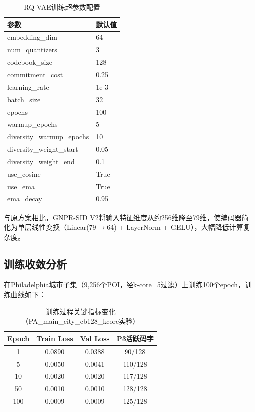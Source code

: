 \begin{table}[htbp]
\centering
\caption{RQ-VAE训练超参数配置}
\label{tab:rqvae_training_params}
\begin{tabular}{ll}
\toprule
参数 & 默认值 \\
\midrule
embedding\_dim & 64 \\
num\_quantizers & 3 \\
codebook\_size & 128 \\
commitment\_cost & 0.25 \\
learning\_rate & 1e-3 \\
batch\_size & 32 \\
epochs & 100 \\
warmup\_epochs & 5 \\
diversity\_warmup\_epochs & 10 \\
diversity\_weight\_start & 0.05 \\
diversity\_weight\_end & 0.1 \\
use\_cosine & True \\
use\_ema & True \\
ema\_decay & 0.95 \\
\bottomrule
\end{tabular}
\end{table}

与原方案相比，GNPR-SID V2将输入特征维度从约256维降至79维，使编码器简化为单层线性变换（Linear(79$\rightarrow$64) + LayerNorm + GELU），大幅降低计算复杂度。

\subsection{训练收敛分析}
\label{sec:convergence_analysis}

在Philadelphia城市子集（9,256个POI，经k-core=5过滤）上训练100个epoch，训练曲线如下：

\begin{table}[H]
\centering
\caption{训练过程关键指标变化（PA\_main\_city\_cb128\_kcore实验）}
\label{tab:convergence}
\begin{tabular}{c|cc|c}
\toprule
Epoch & Train Loss & Val Loss & P3活跃码字 \\
\midrule
1   & 0.0890 & 0.0388 & 90/128 \\
5   & 0.0050 & 0.0041 & 110/128 \\
10  & 0.0020 & 0.0020 & 117/128 \\
50  & 0.0010 & 0.0010 & 128/128 \\
100 & 0.0009 & 0.0009 & 125/128 \\
\bottomrule
\end{tabular}
\end{table}

